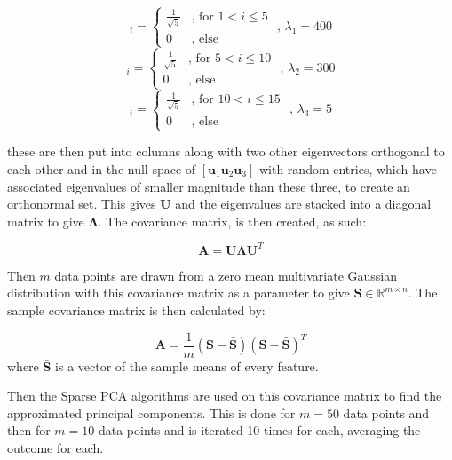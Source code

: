 \documentclass[11pt,a4paper]{article}
\begin{document}
\begin{equation*}
[\mathbf{u}_1]_i = \begin{cases}
       \frac{1}{\sqrt{5}} & \text{, for } 1<i\le 5 \\
       0 & \text{, else }
        \end{cases}
        \text{              , } \lambda_1 = 400
\end{equation*}
\begin{equation*}
[\mathbf{u}_2]_i = \begin{cases}
       \frac{1}{\sqrt{5}} & \text{, for } 5<i\le 10  \\
       0 & \text{, else }
        \end{cases}
        \text{              , } \lambda_2 = 300
\end{equation*}
\begin{equation*}
[\mathbf{u}_3]_i = \begin{cases}
       \frac{1}{\sqrt{5}} & \text{, for } 10<i\le 15  \\
       0 & \text{, else }
	  \end{cases}  
	  \text{              , } \lambda_3 = 5  
\end{equation*}
       
these are then put into columns along with two other eigenvectors orthogonal to each other and in the null space of $[\mathbf{u}_1 \mathbf{u}_2 \mathbf{u}_3]$ with random entries, which have associated eigenvalues of smaller magnitude than these three, to create an orthonormal set. This gives $\mathbf{U}$ and the eigenvalues are stacked into a diagonal matrix to give $\mathbf{\Lambda}$. The covariance matrix, is then created, as such:

\begin{equation*}
\mathbf{A} = \mathbf{U}\mathbf{\Lambda}\mathbf{U}^T
\end{equation*}


Then $m$ data points are drawn from a  zero mean multivariate Gaussian distribution  with this covariance matrix as a parameter to give $\mathbf{S} \in \mathbb{R}^{m \times n}$. The sample covariance matrix is then calculated by:

\begin{equation*}
\mathbf{A} = \frac{1}{m}\left(\mathbf{S} - \bar{\mathbf{S}}\right)\left(\mathbf{S} - \bar{\mathbf{S}}\right)^T
\end{equation*}
where $\bar{\mathbf{S}}$ is a vector of the sample means of every feature.

Then the Sparse PCA algorithms are used on this covariance matrix to find the approximated principal components. This is done for $m=50$ data points and then for $m=10$ data points and is iterated 10 times for each, averaging the outcome for each. 
\end{document}
